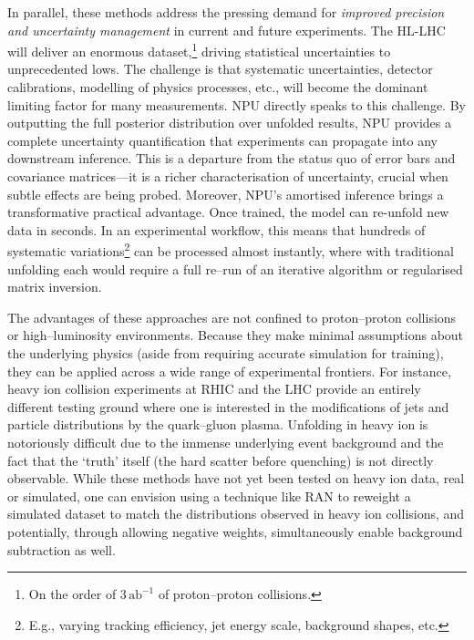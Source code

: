         In parallel, these methods address the pressing demand for \emph{improved precision and uncertainty management} in current and future experiments.
        The HL-LHC will deliver an enormous dataset,\footnote{On the order of $3\,\text{ab}^{-1}$ of proton--proton collisions.} driving statistical uncertainties to unprecedented lows.
        The challenge is that systematic uncertainties, detector calibrations, modelling of physics processes, etc., will become the dominant limiting factor for many measurements.
        NPU directly speaks to this challenge.
        By outputting the full posterior distribution over unfolded results, NPU provides a complete uncertainty quantification that experiments can propagate into any downstream inference.
        This is a departure from the status quo of error bars and covariance matrices---it is a richer characterisation of uncertainty, crucial when subtle effects are being probed.
        Moreover, NPU's amortised inference brings a transformative practical advantage.
        Once trained, the model can re-unfold new data in seconds.
        In an experimental workflow, this means that hundreds of systematic variations\footnote{E.g., varying tracking efficiency, jet energy scale, background shapes, etc.} can be processed almost instantly, where with traditional unfolding each would require a full re--run of an iterative algorithm or regularised matrix inversion.
    
        The advantages of these approaches are not confined to proton--proton collisions or high--luminosity environments.
        Because they make minimal assumptions about the underlying physics (aside from requiring accurate simulation for training), they can be applied across a wide range of experimental frontiers.
        For instance, heavy ion collision experiments at RHIC and the LHC provide an entirely different testing ground where one is interested in the modifications of jets and particle distributions by the quark--gluon plasma.
        Unfolding in heavy ion is notoriously difficult due to the immense underlying event background and the fact that the `truth' itself (the hard scatter before quenching) is not directly observable.
        While these methods have not yet been tested on heavy ion data, real or simulated, one can envision using a technique like RAN to reweight a simulated dataset to match the distributions observed in heavy ion collisions, and potentially, through allowing negative weights, simultaneously enable background subtraction as well.
        
